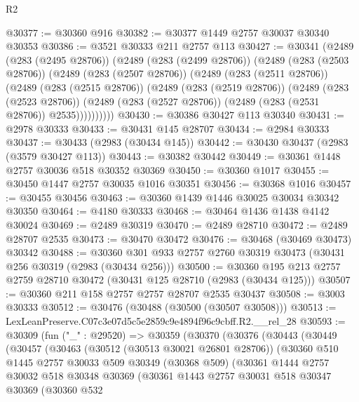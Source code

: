 \begin{lexlean}{R2}
\begin{coremodule}
@30377 := @30360 @916
@30382 := @30377 @1449 @2757 @30037 @30340 @30353
@30386 := @3521 @30333 @211 @2757 @113
@30427 := @30341
    (@2489
      (@283 (@2495 @28706))
      (@2489
        (@283 (@2499 @28706))
        (@2489
          (@283 (@2503 @28706))
          (@2489
            (@283 (@2507 @28706))
            (@2489
              (@283 (@2511 @28706))
              (@2489
                (@283 (@2515 @28706))
                (@2489
                  (@283 (@2519 @28706))
                  (@2489
                    (@283 (@2523 @28706))
                    (@2489 (@283 (@2527 @28706)) (@2489 (@283 (@2531 @28706)) @2535))))))))))
@30430 := @30386 @30427 @113 @30340
@30431 := @2978 @30333
@30433 := @30431 @145 @28707
@30434 := @2984 @30333
@30437 := @30433 (@2983 (@30434 @145))
@30442 := @30430 @30437 (@2983 (@3579 @30427 @113))
@30443 := @30382 @30442
@30449 := @30361 @1448 @2757 @30036 @518 @30352 @30369
@30450 := @30360 @1017
@30455 := @30450 @1447 @2757 @30035 @1016 @30351
@30456 := @30368 @1016
@30457 := @30455 @30456
@30463 := @30360 @1439 @1446 @30025 @30034 @30342 @30350
@30464 := @4180 @30333
@30468 := @30464 @1436 @1438 @4142 @30024
@30469 := @2489 @30319
@30470 := @2489 @28710
@30472 := @2489 @28707 @2535
@30473 := @30470 @30472
@30476 := @30468 (@30469 @30473) @30342
@30488 := @30360 @301 @933 @2757 @2760 @30319 @30473 (@30431 @256 @30319 (@2983 (@30434 @256)))
@30500 := @30360 @195 @213 @2757 @2759 @28710 @30472 (@30431 @125 @28710 (@2983 (@30434 @125)))
@30507 := @30360 @211 @158 @2757 @2757 @28707 @2535 @30437
@30508 := @3003 @30333
@30512 := @30476 (@30488 (@30500 (@30507 @30508)))
@30513 := LexLeanPreserve.C07c3e07d5c5e2859c9e4894f96c9cbff.R2.__rel_28
@30593 := @30309
    (fun ("_" : @29520) =>
    @30359
      (@30370
        (@30376
          (@30443
            (@30449
              (@30457
                (@30463
                  (@30512 (@30513 @30021 @26801 @28706))
                  (@30360
                    @510
                    @1445
                    @2757
                    @30033
                    @509
                    @30349
                    (@30368 @509)
                    (@30361
                      @1444
                      @2757
                      @30032
                      @518
                      @30348
                      @30369
                      (@30361
                        @1443
                        @2757
                        @30031
                        @518
                        @30347
                        @30369
                        (@30360
                          @532

\end{coremodule}
\end{lexlean}
